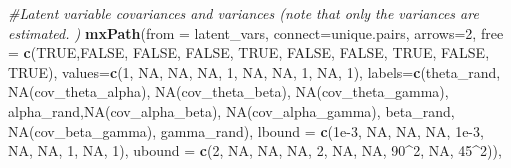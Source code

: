 \documentclass[
12pt, %
twoside,
english]{guelphthesis}
\newenvironment{Shaded}{\begin{snugshade}}{\end{snugshade}}
\newcommand{\AttributeTok}[1]{\textcolor[rgb]{0.13,0.29,0.53}{#1}}
\newcommand{\CommentTok}[1]{\textcolor[rgb]{0.56,0.35,0.01}{\textit{#1}}}
\newcommand{\ConstantTok}[1]{\textcolor[rgb]{0.56,0.35,0.01}{#1}}
\newcommand{\DecValTok}[1]{\textcolor[rgb]{0.00,0.00,0.81}{#1}}
\newcommand{\FloatTok}[1]{\textcolor[rgb]{0.00,0.00,0.81}{#1}}
\newcommand{\FunctionTok}[1]{\textcolor[rgb]{0.13,0.29,0.53}{\textbf{#1}}}
\newcommand{\NormalTok}[1]{#1}
\newcommand{\SpecialCharTok}[1]{\textcolor[rgb]{0.81,0.36,0.00}{\textbf{#1}}}
\newcommand{\StringTok}[1]{\textcolor[rgb]{0.31,0.60,0.02}{#1}}
\begin{document}
\begin{Shaded}
\begin{Highlighting}[numbers=left,,]
  \CommentTok{\#Latent variable covariances and variances (note that only the variances are estimated. )}
  \FunctionTok{mxPath}\NormalTok{(}\AttributeTok{from =}\NormalTok{ latent\_vars,}
         \AttributeTok{connect=}\StringTok{\textquotesingle{}unique.pairs\textquotesingle{}}\NormalTok{, }\AttributeTok{arrows=}\DecValTok{2}\NormalTok{,}
         \AttributeTok{free =} \FunctionTok{c}\NormalTok{(}\ConstantTok{TRUE}\NormalTok{,}\ConstantTok{FALSE}\NormalTok{, }\ConstantTok{FALSE}\NormalTok{, }\ConstantTok{FALSE}\NormalTok{, }
                  \ConstantTok{TRUE}\NormalTok{, }\ConstantTok{FALSE}\NormalTok{, }\ConstantTok{FALSE}\NormalTok{, }
                  \ConstantTok{TRUE}\NormalTok{, }\ConstantTok{FALSE}\NormalTok{, }
                  \ConstantTok{TRUE}\NormalTok{), }
         \AttributeTok{values=}\FunctionTok{c}\NormalTok{(}\DecValTok{1}\NormalTok{, }\ConstantTok{NA}\NormalTok{, }\ConstantTok{NA}\NormalTok{, }\ConstantTok{NA}\NormalTok{, }
                  \DecValTok{1}\NormalTok{, }\ConstantTok{NA}\NormalTok{, }\ConstantTok{NA}\NormalTok{, }
                  \DecValTok{1}\NormalTok{, }\ConstantTok{NA}\NormalTok{,}
                  \DecValTok{1}\NormalTok{),}
         \AttributeTok{labels=}\FunctionTok{c}\NormalTok{(}\StringTok{\textquotesingle{}theta\_rand\textquotesingle{}}\NormalTok{, }\StringTok{\textquotesingle{}NA(cov\_theta\_alpha)\textquotesingle{}}\NormalTok{, }\StringTok{\textquotesingle{}NA(cov\_theta\_beta)\textquotesingle{}}\NormalTok{, }
                  \StringTok{\textquotesingle{}NA(cov\_theta\_gamma)\textquotesingle{}}\NormalTok{,}
                  \StringTok{\textquotesingle{}alpha\_rand\textquotesingle{}}\NormalTok{,}\StringTok{\textquotesingle{}NA(cov\_alpha\_beta)\textquotesingle{}}\NormalTok{, }\StringTok{\textquotesingle{}NA(cov\_alpha\_gamma)\textquotesingle{}}\NormalTok{, }
                  \StringTok{\textquotesingle{}beta\_rand\textquotesingle{}}\NormalTok{, }\StringTok{\textquotesingle{}NA(cov\_beta\_gamma)\textquotesingle{}}\NormalTok{, }
                  \StringTok{\textquotesingle{}gamma\_rand\textquotesingle{}}\NormalTok{), }
         \AttributeTok{lbound =} \FunctionTok{c}\NormalTok{(}\FloatTok{1e{-}3}\NormalTok{, }\ConstantTok{NA}\NormalTok{, }\ConstantTok{NA}\NormalTok{, }\ConstantTok{NA}\NormalTok{, }
                    \FloatTok{1e{-}3}\NormalTok{, }\ConstantTok{NA}\NormalTok{, }\ConstantTok{NA}\NormalTok{, }
                    \DecValTok{1}\NormalTok{, }\ConstantTok{NA}\NormalTok{,}
                    \DecValTok{1}\NormalTok{), }
         \AttributeTok{ubound =} \FunctionTok{c}\NormalTok{(}\DecValTok{2}\NormalTok{, }\ConstantTok{NA}\NormalTok{, }\ConstantTok{NA}\NormalTok{, }\ConstantTok{NA}\NormalTok{, }
                    \DecValTok{2}\NormalTok{, }\ConstantTok{NA}\NormalTok{, }\ConstantTok{NA}\NormalTok{, }
                    \DecValTok{90}\SpecialCharTok{\^{}}\DecValTok{2}\NormalTok{, }\ConstantTok{NA}\NormalTok{, }
                    \DecValTok{45}\SpecialCharTok{\^{}}\DecValTok{2}\NormalTok{)),}
  

\end{Highlighting}
\end{Shaded}
\end{document}
